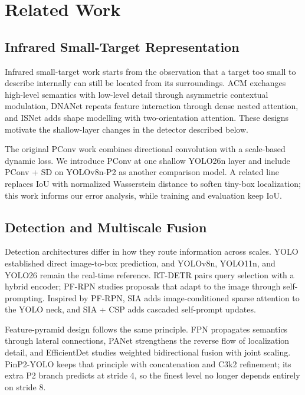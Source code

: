 \documentclass[lettersize,journal]{IEEEtran}
\begin{document}
\section{Related Work}
\IEEEpubidadjcol
\subsection{Infrared Small-Target Representation}
Infrared small-target work starts from the observation that a target too small to describe internally can still be located from its surroundings. ACM exchanges high-level semantics with low-level detail through asymmetric contextual modulation\cite{dai2021acm}, DNANet repeats feature interaction through dense nested attention\cite{li2023dnanet}, and ISNet adds shape modelling with two-orientation attention\cite{zhang2022isnet}. These designs motivate the shallow-layer changes in the detector described below.

The original PConv work combines directional convolution with a scale-based dynamic loss\cite{yang2025pconv}. We introduce PConv at one shallow YOLO26n layer and include PConv + SD on YOLOv8n-P2 as another comparison model. A related line replaces IoU with normalized Wasserstein distance to soften tiny-box localization\cite{wang2021nwd}; this work informs our error analysis, while training and evaluation keep IoU.

\subsection{Detection and Multiscale Fusion}
Detection architectures differ in how they route information across scales. YOLO established direct image-to-box prediction\cite{redmon2016yolo}, and YOLOv8n, YOLO11n, and YOLO26 remain the real-time reference\cite{ultralyticscode,jocher2026yolo26}. RT-DETR pairs query selection with a hybrid encoder\cite{zhao2024rtdetr}; PF-RPN studies proposals that adapt to the image through self-prompting\cite{tang2026pfrpn,pfrpncode}. Inspired by PF-RPN, SIA adds image-conditioned sparse attention to the YOLO neck, and SIA + CSP adds cascaded self-prompt updates.

Feature-pyramid design follows the same principle. FPN propagates semantics through lateral connections\cite{lin2017fpn}, PANet strengthens the reverse flow of localization detail\cite{liu2018panet}, and EfficientDet studies weighted bidirectional fusion with joint scaling\cite{tan2020efficientdet}. PinP2-YOLO keeps that principle with concatenation and C3k2 refinement; its extra P2 branch predicts at stride 4, so the finest level no longer depends entirely on stride 8.
\end{document}
